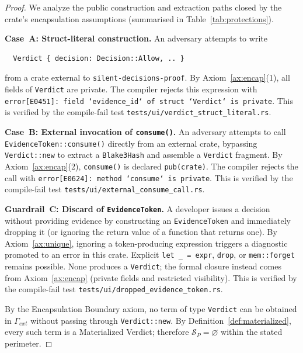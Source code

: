 \begin{proof}
We analyze the public construction and extraction paths closed by the
crate's encapsulation assumptions (summarised in
Table~\ref{tab:protections}).

\medskip
\noindent\textbf{Case~A: Struct-literal construction.}
An adversary attempts to write
\begin{verbatim}
  Verdict { decision: Decision::Allow, .. }
\end{verbatim}
from a crate external to \texttt{silent-decisions-proof}.
By Axiom~\ref{ax:encap}(1), all fields of \texttt{Verdict} are
private.  The compiler rejects this expression with
\texttt{error[E0451]: field `evidence\_id` of struct `Verdict` is
private}.  This is verified by the compile-fail test
\texttt{tests/ui/verdict\_struct\_literal.rs}.

\medskip
\noindent\textbf{Case~B: External invocation of \texttt{consume()}.}
An adversary attempts to call
\texttt{EvidenceToken::consume()} directly from an external crate,
bypassing \texttt{Verdict::new} to extract a \texttt{Blake3Hash} and
assemble a \texttt{Verdict} fragment.
By Axiom~\ref{ax:encap}(2), \texttt{consume()} is declared
\texttt{pub(crate)}.  The compiler rejects the call with
\texttt{error[E0624]: method `consume` is private}.
This is verified by the compile-fail test
\texttt{tests/ui/external\_consume\_call.rs}.

\medskip
\noindent\textbf{Guardrail~C: Discard of \texttt{EvidenceToken}.}
A developer issues a decision without providing evidence by
constructing an \texttt{EvidenceToken} and immediately dropping it
(or ignoring the return value of a function that returns one).
By Axiom~\ref{ax:unique}, ignoring a token-producing expression triggers
a diagnostic promoted to an error in this crate.  Explicit
\texttt{let \_ = expr}, \texttt{drop}, or \texttt{mem::forget} remains
possible.  None produces a \texttt{Verdict}; the formal closure instead
comes from Axiom~\ref{ax:encap} (private fields and restricted visibility).
This is verified by the compile-fail test
\texttt{tests/ui/dropped\_evidence\_token.rs}.

\medskip
By the Encapsulation Boundary axiom, no term of type \texttt{Verdict}
can be obtained in $\Gamma_{\mathit{ext}}$ without passing through
\texttt{Verdict::new}.  By Definition~\ref{def:materialized}, every
such term is a Materialized Verdict; therefore
$\mathcal{S}_{P}=\varnothing$ within the stated perimeter.
\end{proof}

